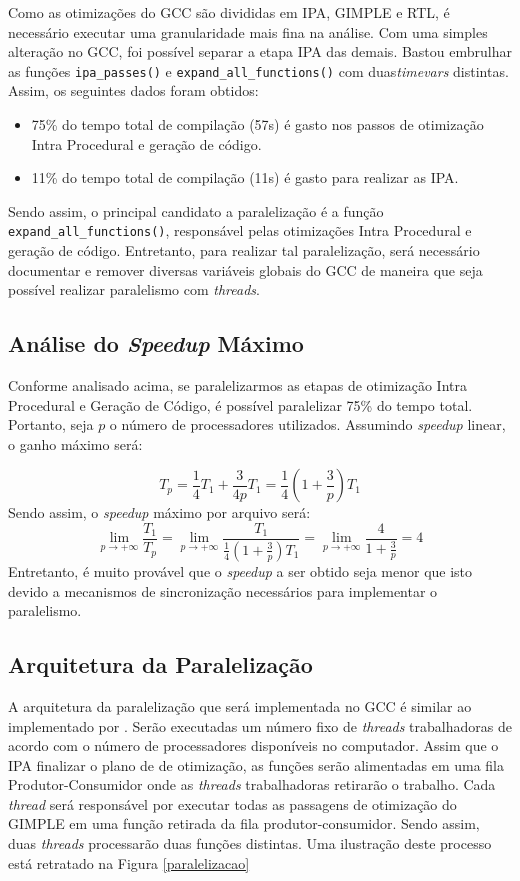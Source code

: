 Como as otimizações do GCC são divididas em IPA, GIMPLE e RTL, é necessário
executar uma granularidade mais fina na análise. Com uma simples alteração
no GCC, foi possível separar a etapa IPA das demais. Bastou embrulhar as funções
\texttt{ipa\_passes()} e \texttt{expand\_all\_functions()} com duas\textit{timevars}
distintas. Assim, os seguintes dados foram obtidos:
\begin{itemize}
    \item 75\% do tempo total de compilação (57s) é gasto nos passos de otimização
        Intra Procedural e geração de código.

    \item 11\% do tempo total de compilação (11s) é gasto para realizar as IPA.
\end{itemize}
Sendo assim, o principal candidato a paralelização é a função \texttt{expand\_all\_functions()},
responsável pelas otimizações Intra Procedural e geração de código.
Entretanto, para realizar tal paralelização, será necessário documentar e remover diversas
variáveis globais do GCC de maneira que seja possível realizar paralelismo com \textit{threads}.

\subsection{Análise do \textit{Speedup} Máximo}

Conforme analisado acima, se paralelizarmos as etapas de otimização Intra
Procedural e Geração de Código, é possível paralelizar 75\% do tempo total.
Portanto, seja $p$ o número de processadores utilizados. Assumindo
\textit{speedup} linear, o ganho máximo será:

$$ T_p = \frac{1}{4} T_1 + \frac{3}{4p}T_1 = \frac{1}{4} \left( 1 + \frac{3}{p}
\right)T_1 $$ Sendo assim, o \textit{speedup} máximo por arquivo será: $$
\lim_{p \rightarrow +\infty} \frac{T_1}{T_p} = \lim_{p \rightarrow +\infty}
\frac{T_1}{\frac{1}{4} \left( 1 + \frac{3}{p} \right)T_1} = \lim_{p \rightarrow
+\infty} \frac{4}{1 + \frac{3}{p}} = 4$$
Entretanto, é muito provável que o \textit{speedup} a ser obtido seja menor que isto
devido a mecanismos de sincronização necessários para implementar o paralelismo.

\subsection{Arquitetura da Paralelização}

A arquitetura da paralelização que será implementada no GCC é similar ao
implementado por \cite{wortman1992}. Serão executadas um número fixo de
\textit{threads} trabalhadoras de acordo com o número de processadores
disponíveis no computador.
Assim que o IPA finalizar o plano de
de otimização, as funções serão alimentadas em uma fila Produtor-Consumidor
onde as \textit{threads} trabalhadoras retirarão o trabalho.
Cada \textit{thread} será responsável por executar todas as passagens
de otimização do GIMPLE em uma função retirada da fila produtor-consumidor.
Sendo assim, duas \textit{threads} processarão duas funções distintas.
Uma ilustração deste processo está retratado na Figura \ref{paralelizacao}

